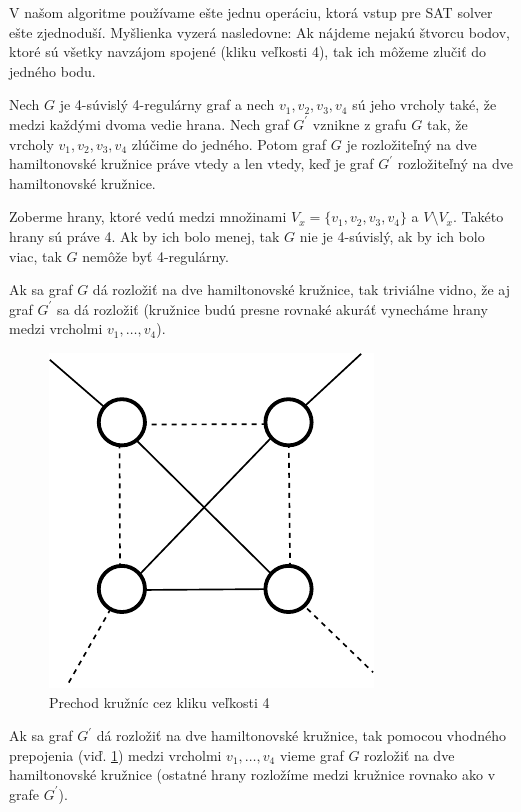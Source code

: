 \medskip

V našom algoritme používame ešte jednu operáciu, ktorá vstup pre SAT solver ešte zjednoduší.
Myšlienka vyzerá nasledovne: Ak nájdeme nejakú štvorcu bodov, ktoré sú všetky navzájom spojené
(kliku veľkosti 4), tak
ich môžeme zlučiť do jedného bodu.

\begin{veta}
Nech $G$ je 4-súvislý 4-regulárny graf a nech $v_1, v_2, v_3, v_4$ sú jeho vrcholy také, že medzi
každými dvoma vedie hrana. Nech graf $G^{'}$ vznikne z grafu $G$ tak, že vrcholy $v_1, v_2, v_3,
v_4$ zlúčime do jedného. Potom graf $G$ je rozložiteľný na dve hamiltonovské kružnice práve vtedy a
len vtedy, keď je graf $G^{'}$ rozložiteľný na dve hamiltonovské kružnice.
\end{veta}

\begin{dokaz}
Zoberme hrany, ktoré vedú medzi množinami $V_x = \{v_1, v_2, v_3, v_4\}$ a $V \setminus V_x$.
Takéto hrany sú práve 4. Ak by ich bolo menej, tak $G$ nie je 4-súvislý, ak by ich bolo viac, tak
$G$ nemôže byť 4-regulárny.

Ak sa graf $G$ dá rozložiť na dve hamiltonovské kružnice, tak triviálne vidno, že aj graf $G^{'}$ sa
dá rozložiť (kružnice budú presne rovnaké akuráť vynecháme hrany medzi vrcholmi $v_1, \dots, v_4$).

\begin{figure}[h]
\centering
\includegraphics[scale=0.5]{img/k4.pdf}
\caption{Prechod kružníc cez kliku veľkosti 4}
\label{fig:k4}
\end{figure}

Ak sa graf $G^{'}$ dá rozložiť na dve hamiltonovské kružnice, tak pomocou vhodného prepojenia (viď.
\ref{fig:k4}) medzi
vrcholmi $v_1, \dots, v_4$ vieme graf $G$ rozložiť na dve hamiltonovské kružnice (ostatné hrany
rozložíme medzi kružnice rovnako ako v grafe $G^{'}$).
\end{dokaz}

